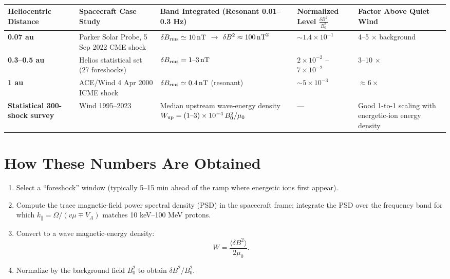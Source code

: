 \begin{table}[h!]
\centering
\begin{tabular}{|p{3.2cm}|p{3.5cm}|p{4.8cm}|p{3cm}|p{3.5cm}|}
\hline
\textbf{Heliocentric Distance} & \textbf{Spacecraft Case Study} & \textbf{Band Integrated (Resonant 0.01--0.3 Hz)} & \textbf{Normalized Level} $\displaystyle \frac{\delta B^{2}}{B_{0}^{2}}$ & \textbf{Factor Above Quiet Wind} \\
\hline
\textbf{0.07 au} & Parker Solar Probe, 5 Sep 2022 CME shock & $\delta B_{\rm rms} \simeq 10\,{\rm nT}$ $\rightarrow$ $\delta B^{2} \approx 100\,{\rm nT}^{2}$ & $\sim 1.4 \times 10^{-1}$ & 4--5 $\times$ background \\
\hline
\textbf{0.3--0.5 au} & Helios statistical set (27 foreshocks) & $\delta B_{\rm rms} = 1\text{--}3\,{\rm nT}$ & $2 \times 10^{-2}$ -- $7 \times 10^{-2}$ & 3--10 $\times$ \\
\hline
\textbf{1 au} & ACE/Wind 4 Apr 2000 ICME shock & $\delta B_{\rm rms} \simeq 0.4\,{\rm nT}$ (resonant) & $\sim 5 \times 10^{-3}$ & $\approx 6 \times$ \\
\hline
\textbf{Statistical 300-shock survey} & Wind 1995--2023 & Median upstream wave-energy density $W_{\rm up} = (1\text{--}3) \times 10^{-4}\,B_0^2 / \mu_0$ & --- & Good 1-to-1 scaling with energetic-ion energy density \\
\hline
\end{tabular}
\caption*{}
\end{table}

\section*{How These Numbers Are Obtained}

\begin{enumerate}
\item Select a ``foreshock'' window (typically 5--15 min ahead of the ramp where energetic ions first appear).
\item Compute the trace magnetic-field power spectral density (PSD) in the spacecraft frame; integrate the PSD over the frequency band for which $k_\parallel = \Omega / (v\mu \mp V_A)$ matches 10 keV--100 MeV protons.
\item Convert to a wave magnetic-energy density:
\[
W = \frac{\langle \delta B^{2} \rangle}{2\mu_{0}}.
\]
\item Normalize by the background field $B_0^2$ to obtain $\delta B^{2} / B_0^{2}$.
\end{enumerate}

